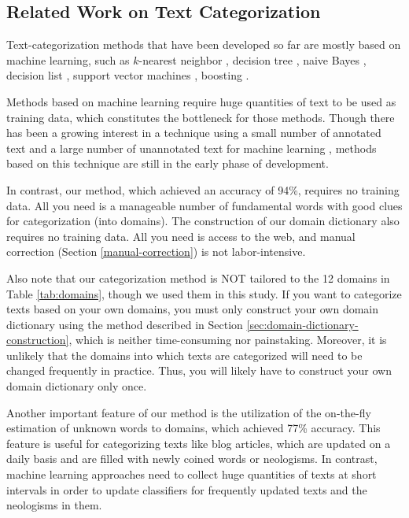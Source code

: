 \documentclass[english]{jnlp_1.4_rep}
\begin{document}
\subsection{Related Work on Text Categorization}
\label{sec:related-work-on-text-categorization}

Text-categorization methods that have been developed so far are mostly
based on machine learning, such as
$k$-nearest neighbor \cite{yang99evaluation},
decision tree \cite{lewis94comparison},
naive Bayes \cite{lewis98naive},
decision list \cite{li99text},
support vector machines \cite{Joachims:1999},
boosting \cite{schapire00boostexter}.

Methods based on machine learning require huge quantities of text to be
used as training data, which constitutes the bottleneck for those
methods.
Though there has been a growing interest in a technique using
a small number of annotated text and a large number of unannotated
text for machine learning \cite{Abney:2007}, 
methods based on this technique are still 
in the early phase of development.

In contrast, our method, which achieved an accuracy of 94\%,
requires no training data.
All you need is a manageable number of fundamental words with good clues
for categorization (into domains).
The construction of our domain dictionary also requires no
training data.
All you need is access to the web, and manual correction
(Section \ref{manual-correction}) is not labor-intensive.

Also note that our categorization method is NOT tailored to the 12
domains in Table \ref{tab:domains}, though we used them in this
study. 
If you want to categorize texts based on your own domains,
you must only construct your own domain dictionary using the
method described in Section \ref{sec:domain-dictionary-construction},
which is neither time-consuming nor painstaking.
Moreover, it is unlikely that the domains into which
texts are categorized will need to be changed frequently in practice.
Thus, you will likely have to construct your own domain dictionary only
once.

Another important feature of our method is the utilization of the
on-the-fly estimation of unknown words to domains, which achieved 
77\% accuracy.
This feature is useful for categorizing texts like blog articles,
which are updated on a daily basis and are filled with newly coined
words or neologisms.
In contrast, machine learning approaches need to collect huge quantities
of texts at short intervals in order to update classifiers for
frequently updated texts and the neologisms in them.
\end{document}
